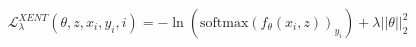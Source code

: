 \documentclass[preview]{standalone}
\begin{document}
\begin{align*}
\mathcal{L}_{\lambda}^{XENT}(\theta, z, x_i, y_i, i) = - \ln(\text{softmax}(f_{\theta}(x_i, z))_{y_i}) + \lambda \left|\left| \theta \right|\right|_2^2
\end{align*}
\end{document}
